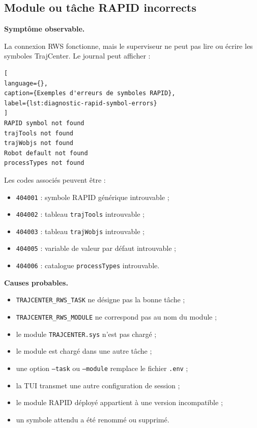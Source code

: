 \documentclass{rapportENSAM}
\begin{document}
\subsection{Module ou tâche RAPID incorrects}
\label{subsec:diagnostic-rapid-task-module}

\textbf{Symptôme observable.}

La connexion RWS fonctionne, mais le superviseur ne peut pas lire ou écrire les
symboles TrajCenter. Le journal peut afficher :

\begin{lstlisting}[
language={},
caption={Exemples d'erreurs de symboles RAPID},
label={lst:diagnostic-rapid-symbol-errors}
]
RAPID symbol not found
trajTools not found
trajWobjs not found
Robot default not found
processTypes not found
\end{lstlisting}

Les codes associés peuvent être :

\begin{itemize}
\item \texttt{404001} : symbole RAPID générique introuvable ;
\item \texttt{404002} : tableau \texttt{trajTools} introuvable ;
\item \texttt{404003} : tableau \texttt{trajWobjs} introuvable ;
\item \texttt{404005} : variable de valeur par défaut introuvable ;
\item \texttt{404006} : catalogue \texttt{processTypes} introuvable.
\end{itemize}

\textbf{Causes probables.}

\begin{itemize}
\item \texttt{TRAJCENTER\_RWS\_TASK} ne désigne pas la bonne tâche ;
\item \texttt{TRAJCENTER\_RWS\_MODULE} ne correspond pas au nom du module ;
\item le module \texttt{TRAJCENTER.sys} n'est pas chargé ;
\item le module est chargé dans une autre tâche ;
\item une option \texttt{--task} ou \texttt{--module} remplace le fichier
\texttt{.env} ;
\item la TUI transmet une autre configuration de session ;
\item le module RAPID déployé appartient à une version incompatible ;
\item un symbole attendu a été renommé ou supprimé.
\end{itemize}
\end{document}
